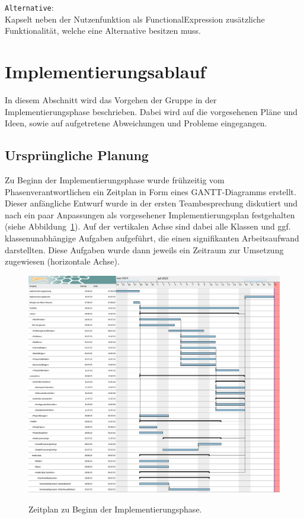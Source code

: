 \documentclass{article}
\newcommand{\classref}[1]{\texttt{#1}}
\begin{document}
\classref{Alternative}: \\Kapselt neben der Nutzenfunktion als FunctionalExpression zusätzliche Funktionalität, welche eine Alternative besitzen muss.


\newpage
\section{Implementierungsablauf}

In diesem Abschnitt wird das Vorgehen der Gruppe in der Implementierungsphase beschrieben. Dabei wird auf die vorgesehenen Pläne und Ideen, sowie auf aufgetretene Abweichungen und Probleme eingegangen.

\subsection{Ursprüngliche Planung}

Zu Beginn der Implementierungsphase wurde frühzeitig vom Phasenverantwortlichen ein Zeitplan in Form eines \gls{GANTT}-Diagramms erstellt. Dieser anfängliche Entwurf wurde in der ersten Teambesprechung diskutiert und nach ein paar Anpassungen als vorgesehener Implementierungsplan festgehalten (siehe Abbildung~\ref{fig:gantt_plan1}). Auf der vertikalen Achse sind dabei alle Klassen und ggf. klassenunabhängige Aufgaben aufgeführt, die einen signifikanten Arbeitsaufwand darstellten. Diese Aufgaben wurde dann jeweils ein Zeitraum zur Umsetzung zugewiesen (horizontale Achse).

\begin{figure}[H]%
    \centering
    \includegraphics[width=12cm]{img/gantt_plan1.png}
    \label{fig:gantt_plan1}
    \caption{Zeitplan zu Beginn der Implementierungsphase.}
\end{figure}
\end{document}
